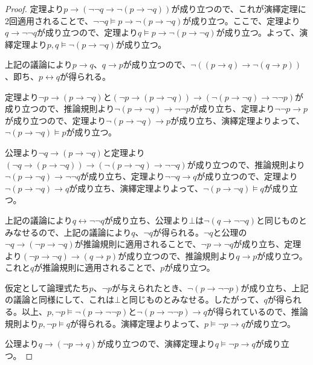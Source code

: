 \documentclass[a4paper]{jsarticle}
\begin{document}
\begin{proof}
定理より$p \rightarrow \left( \neg\neg q \rightarrow \neg(p \rightarrow \neg q) \right)$が成り立つので、これが演繹定理に2回適用されることで、$\neg\neg q \vDash p \rightarrow \neg(p \rightarrow \neg q)$が成り立つ。ここで、定理より$q \rightarrow \neg\neg q$が成り立つので、定理より$q \vDash p \rightarrow \neg(p \rightarrow \neg q)$が成り立つ。よって、演繹定理より$p,q \vDash \neg(p \rightarrow \neg q)$が成り立つ。\par
上記の議論により$p \rightarrow q$、$q \rightarrow p$が成り立つので、$\neg\left( (p \rightarrow q) \rightarrow \neg(q \rightarrow p) \right)$、即ち、$p \leftrightarrow q$が得られる。\par
定理より$\neg p \rightarrow (p \rightarrow \neg q)$と$\left( \neg p \rightarrow (p \rightarrow \neg q) \right) \rightarrow \left( \neg(p \rightarrow \neg q) \rightarrow \neg\neg p \right)$が成り立つので、推論規則より$\neg(p \rightarrow \neg q) \rightarrow \neg\neg p$が成り立ち、定理より$\neg\neg p \rightarrow p$が成り立つので、定理より$\neg(p \rightarrow \neg q) \rightarrow p$が成り立ち、演繹定理よりよって、$\neg(p \rightarrow \neg q) \vDash p$が成り立つ。\par
公理より$\neg q \rightarrow (p \rightarrow \neg q)$と定理より$\left( \neg q \rightarrow (p \rightarrow \neg q) \right) \rightarrow \left( \neg(p \rightarrow \neg q) \rightarrow \neg\neg q \right)$が成り立つので、推論規則より$\neg(p \rightarrow \neg q) \rightarrow \neg\neg q$が成り立ち、定理より$\neg\neg q \rightarrow q$が成り立つので、定理より$\neg(p \rightarrow \neg q) \rightarrow q$が成り立ち、演繹定理よりよって、$\neg(p \rightarrow \neg q) \vDash q$が成り立つ。\par
上記の議論により$q \leftrightarrow \neg\neg q$が成り立ち、公理より$\bot$は$\neg(q \rightarrow \neg\neg q)$と同じものとみなせるので、上記の議論により$q$、$\neg q$が得られる。$\neg q$と公理の$\neg q \rightarrow (\neg p \rightarrow \neg q)$が推論規則に適用されることで、$\neg p \rightarrow \neg q$が成り立ち、定理より$(\neg p \rightarrow \neg q) \rightarrow (q \rightarrow p)$が成り立つので、推論規則より$q \rightarrow p$が成り立つ。これと$q$が推論規則に適用されることで、$p$が成り立つ。\par
仮定として論理式たち$p$、$\neg p$が与えられたとき、$\neg(p \rightarrow \neg\neg p)$が成り立ち、上記の議論と同様にして、これは$\bot$と同じものとみなせる。したがって、$q$が得られる。以上、$p,\neg p \vDash \neg(p \rightarrow \neg\neg p)$と$\neg(p \rightarrow \neg\neg p) \rightarrow q$が得られているので、推論規則より$p,\neg p \vDash q$が得られる。演繹定理よりよって、$p \vDash \neg p \rightarrow q$が成り立つ。\par
公理より$q \rightarrow (\neg p \rightarrow q)$が成り立つので、演繹定理より$q \vDash \neg p \rightarrow q$が成り立つ。
\end{proof}
\end{document}
